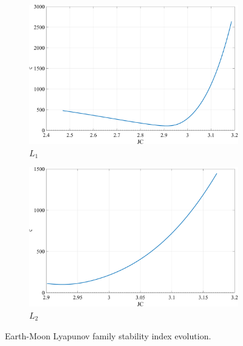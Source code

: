 \begin{figure}[H]
    \begin{subfigure}[h]{0.4\linewidth}
        \includegraphics[width=\textwidth]{figures/L1LyapunovStability.pdf}
        \caption{$L_{1}$}
    \end{subfigure}
    \hfill
    \begin{subfigure}[h]{0.4\linewidth}
        \includegraphics[width=\textwidth]{figures/L2LyapunovStability.pdf}
        \caption{$L_{2}$}
    \end{subfigure}
    \caption{Earth-Moon Lyapunov family stability index evolution.}
    \label{fig:stability}
\end{figure}

